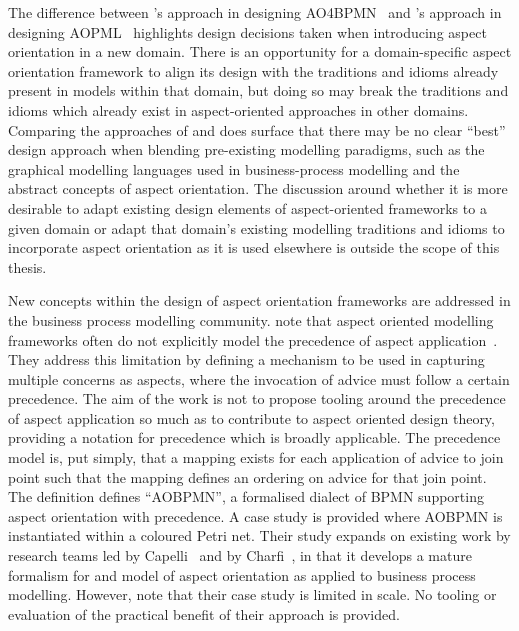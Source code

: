 The difference between \citeauthor{charfi2010AO4BPMN}'s approach in designing
AO4BPMN~\cite{charfi2010AO4BPMN} and \citeauthor{Cappelli_AOBPM}'s approach in
designing AOPML~\cite{Cappelli_AOBPM} highlights design decisions taken when
introducing aspect orientation in a new domain. There is an opportunity for a
domain-specific aspect orientation framework to align its design with the
traditions and idioms already present in models within that domain, but doing so
may break the traditions and idioms which already exist in aspect-oriented
approaches in other domains.  Comparing the approaches of
\citeauthor{charfi2010AO4BPMN} and \citeauthor{Cappelli_AOBPM} does surface that
there may be no clear ``best'' design approach when blending pre-existing
modelling paradigms, such as the graphical modelling languages used in
business-process modelling and the abstract concepts of aspect orientation. The
discussion around whether it is more desirable to adapt existing
design elements of aspect-oriented frameworks to a given domain or adapt that
domain's existing modelling traditions and idioms to incorporate aspect
orientation as it is used elsewhere is outside the scope of this thesis.

New concepts within the design of aspect orientation frameworks are addressed in
the business process modelling community.  note
that aspect oriented modelling frameworks often do not explicitly model the
precedence of aspect application~\cite{jalali2012aspect}. They address this
limitation by defining a mechanism to be used in capturing multiple concerns as
aspects, where the invocation of advice must follow a certain precedence. The
aim of the work is not to propose tooling around the precedence of aspect
application so much as to contribute to aspect oriented design theory, providing
a notation for precedence which is broadly applicable. The precedence model is,
put simply, that a mapping exists for each application of advice to join point
such that the mapping defines an ordering on advice for that join point. The
definition defines ``AOBPMN'', a formalised dialect of BPMN supporting aspect
orientation with precedence. A case study is provided where AOBPMN is
instantiated within a coloured Petri net. Their study expands on existing work
by research teams led by Capelli~\cite{Cappelli_AOBPM,da2020implementation} and
by Charfi~\cite{charfi2007ao4bpel}, in that it develops a mature formalism for
and model of aspect orientation as applied to business process modelling.
However, \citeauthor{jalali2012aspect} note that their case study is limited in
scale. No tooling or evaluation of the practical benefit of their approach is
provided.


